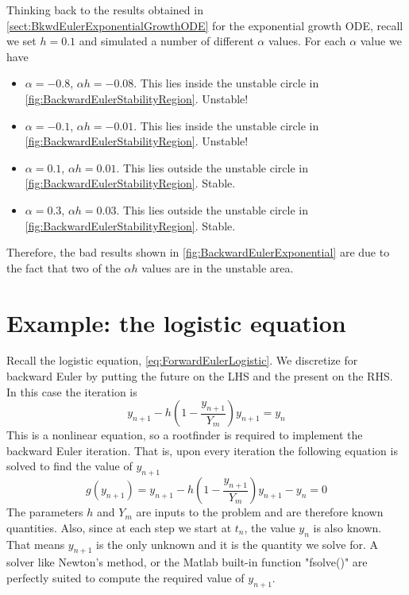 \documentclass[hidelinks,notitlepage]{book}
\begin{document}
Thinking back to the results obtained in \cref{sect:BkwdEulerExponentialGrowthODE} for the exponential growth ODE, recall we set $h = 0.1$ and simulated a number of different $\alpha$ values.  For each $\alpha$ value we have
\begin{itemize}
	\item $\alpha = -0.8$, $\alpha h = -0.08$.  This lies inside the unstable circle in \cref{fig:BackwardEulerStabilityRegion}.  Unstable!
	\item $\alpha = -0.1$, $\alpha h = -0.01$.  This lies inside the unstable circle in \cref{fig:BackwardEulerStabilityRegion}.  Unstable!
	\item $\alpha = 0.1$, $\alpha h = 0.01$.  This lies outside the unstable circle in \cref{fig:BackwardEulerStabilityRegion}.  Stable.
	\item $\alpha = 0.3$, $\alpha h = 0.03$.  This lies outside the unstable circle in \cref{fig:BackwardEulerStabilityRegion}.  Stable.
\end{itemize}
Therefore, the bad results shown in \cref{fig:BackwardEulerExponential} are due to the fact that two of the $\alpha h$ values are in the unstable area.


\section{Example: the logistic equation}
Recall the logistic equation, \cref{eq:ForwardEulerLogistic}.  
We discretize for backward Euler by putting the future on the LHS and the present on the RHS.  In this case the iteration is 
\begin{equation}
\nonumber
y_{n+1} - h \left( 1 - \frac{y_{n+1}}{Y_m} \right)y_{n+1} = y_n
\end{equation}
This is a nonlinear equation, so a rootfinder is required to implement the backward Euler iteration.  That is, upon every iteration the following equation is solved to find the value of $y_{n+1}$
\begin{equation}
\nonumber
g(y_{n+1}) = y_{n+1} - h \left( 1 - \frac{y_{n+1}}{Y_m} \right)y_{n+1} - y_n = 0
\end{equation}
The parameters $h$ and $Y_m$ are inputs to the problem and are therefore known quantities.  Also, since at each step we start at $t_n$, the value $y_n$ is also known.  That means $y_{n+1}$ is the only unknown and it is the quantity we solve for.  A solver like Newton's method, or the Matlab built-in function "fsolve()" are perfectly suited to compute the required value of $y_{n+1}$.
\end{document}
